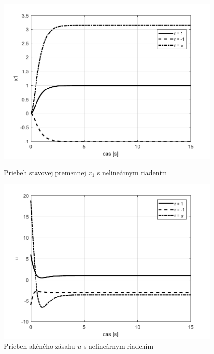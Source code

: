 \documentclass[../main.tex]{subfiles}
\begin{document}
\begin{figure}[!htb]
   \begin{minipage}{0.46\textwidth}
     \centering
     \includegraphics[width=1\linewidth]{x.pdf}
     \caption{Priebeh stavovej premennej $x_1$ s nelineárnym riadením}
	\label{fig:Vysledok1}
   \end{minipage}\hfill
   \begin{minipage}{0.46\textwidth}
     \centering
     \includegraphics[width=1\linewidth]{u.pdf}
     \caption{Priebeh akčného zásahu $u$ s nelineárnym riadením}
	\label{fig:Vysledok2}
   \end{minipage}
\end{figure}
\end{document}
